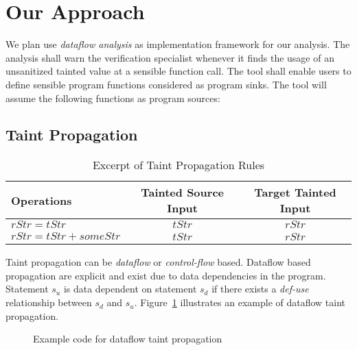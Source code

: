 \section{Our Approach}

We plan use \textit{dataflow analysis} as implementation
framework for our analysis. 
The analysis shall warn the verification specialist
whenever it finds the usage of an unsanitized tainted value
at a sensible function call. The tool shall enable users
to define sensible program functions considered as program
sinks. The tool will assume the following functions as
program sources: 




\subsection{Taint Propagation}\label{analysis:propagation}

\begin{table}[h!]
\begin{center}
  \begin{tabular}{|l|c|c|}
  \hline
  Operations 				& 	Tainted Source Input	&	Target Tainted Input	\\ \hline
  $rStr = tStr$				&	$tStr$					&	$rStr$					\\ \hline
  $rStr = tStr + someStr$	& 	$tStr$					&	$rStr$					\\ \hline
  \end{tabular}
  \caption{Excerpt of Taint Propagation Rules}\label{analysis:propagation:t1}
\end{center}
\end{table}	

Taint propagation can be \textit{dataflow} or \textit{control-flow} based.
Dataflow based propagation are explicit and exist due to data
dependencies in the program. Statement $s_u$ is data dependent
on statement $s_d$ if there exists a \textit{def-use} relationship
between $s_d$ and $s_u$. Figure~\ref{fig:dfpropagation} illustrates
an example of dataflow taint propagation. 

\begin{figure}[!h]
\begin{center}
\end{center}
\caption{Example code for dataflow taint propagation}
\label{fig:dfpropagation}
\end{figure}

